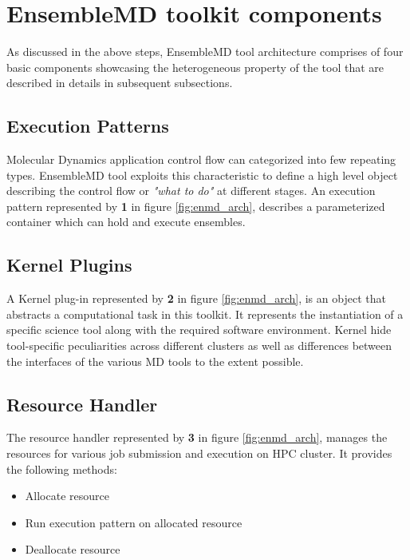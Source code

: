 \documentclass[10pt]{ruthesis}
\begin{document}
\section{EnsembleMD toolkit components}
As discussed in the above steps, EnsembleMD tool architecture comprises of four basic components showcasing the heterogeneous property of the tool that are described in details in subsequent subsections.

\subsection{Execution Patterns}
Molecular Dynamics application control flow can categorized into few repeating types. EnsembleMD tool exploits this characteristic to define a high level object describing the control flow or {\em"what to do"} at different stages. An execution pattern represented by \textbf{{1}} in figure \ref{fig:enmd_arch}, describes a parameterized container which can hold and execute ensembles. 

\subsection{Kernel Plugins}
A Kernel plug-in represented by \textbf{{2}} in figure \ref{fig:enmd_arch}, is an object that abstracts a computational task in this toolkit. It represents the instantiation of a specific science tool along with the required software environment. Kernel hide tool-specific peculiarities across different clusters as well as differences between the interfaces of the various MD tools to the extent possible. 

\subsection{Resource Handler}
The resource handler represented by \textbf{{3}} in figure \ref{fig:enmd_arch}, manages the resources for various job submission and execution on HPC cluster. It provides the following methods:
\begin{itemize}
	\item Allocate resource
	\item Run execution pattern on allocated resource
	\item Deallocate resource
\end{itemize}
\end{document}
